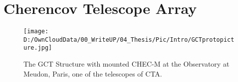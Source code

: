 \documentclass[12pt,article,type=msc,colorback,accentcolor=tud9c]{tudthesis}
\begin{document}


\clearpage
\section{\Large Cherencov Telescope Array}
\label{sec:CTA}

\begin{wrapfigure}{R}{0.6\textwidth}
\centering
\texttt{[image: D:/OwnCloudData/00\_WriteUP/04\_Thesis/Pic/Intro/GCTprotopicture.jpg]}
\caption[GCT and CHEC-M at Meudon]{\label{fig:GCTStructure}The GCT Structure with mounted CHEC-M at the Observatory at Meudon, Paris, one of the telescopes of CTA.}
\end{wrapfigure}
\end{document}
